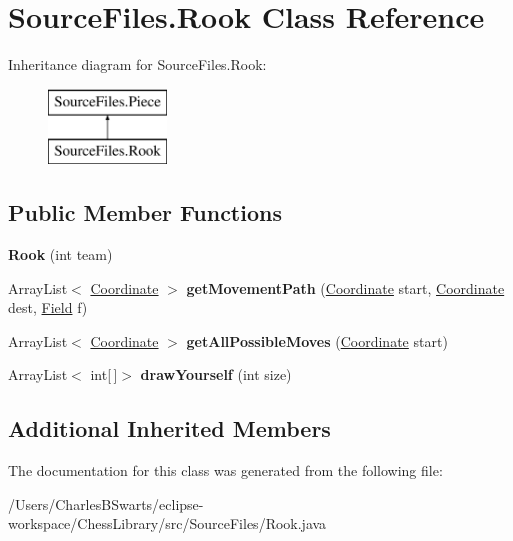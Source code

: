 \hypertarget{class_source_files_1_1_rook}{}\section{Source\+Files.\+Rook Class Reference}
\label{class_source_files_1_1_rook}
Inheritance diagram for Source\+Files.\+Rook\+:\begin{figure}[H]
\begin{center}
\leavevmode
\includegraphics[height=2.000000cm]{class_source_files_1_1_rook}
\end{center}
\end{figure}
\subsection*{Public Member Functions}
\begin{DoxyCompactItemize}
\item 
\mbox{\label{class_source_files_1_1_rook_afc515933b4b8ad359b6363b76f1ba6d6}} 
{\bfseries Rook} (int team)
\item 
\mbox{\label{class_source_files_1_1_rook_a722958ed6f33d35198eff8c66ed0d59e}} 
Array\+List$<$ \mbox{\hyperlink{class_source_files_1_1_coordinate}{Coordinate}} $>$ {\bfseries get\+Movement\+Path} (\mbox{\hyperlink{class_source_files_1_1_coordinate}{Coordinate}} start, \mbox{\hyperlink{class_source_files_1_1_coordinate}{Coordinate}} dest, \mbox{\hyperlink{class_source_files_1_1_field}{Field}} f)
\item 
\mbox{\label{class_source_files_1_1_rook_a8e3f20050ea9209eb170e45d17e82745}} 
Array\+List$<$ \mbox{\hyperlink{class_source_files_1_1_coordinate}{Coordinate}} $>$ {\bfseries get\+All\+Possible\+Moves} (\mbox{\hyperlink{class_source_files_1_1_coordinate}{Coordinate}} start)
\item 
\mbox{\label{class_source_files_1_1_rook_a88f72a165636f7a1b1af4d52b559d161}} 
Array\+List$<$ int\mbox{[}$\,$\mbox{]}$>$ {\bfseries draw\+Yourself} (int size)
\end{DoxyCompactItemize}
\subsection*{Additional Inherited Members}


The documentation for this class was generated from the following file\+:\begin{DoxyCompactItemize}
\item 
/\+Users/\+Charles\+B\+Swarts/eclipse-\/workspace/\+Chess\+Library/src/\+Source\+Files/Rook.\+java\end{DoxyCompactItemize}
